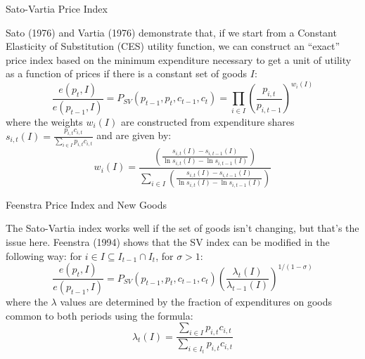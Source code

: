 \documentclass[aspectratio=169]{beamer}
\begin{document}

\begin{frame}{Sato-Vartia Price Index}

Sato (1976) and Vartia (1976) demonstrate that, if we start from a Constant Elasticity of Substitution (CES) utility function, we can construct an ``exact” price index based on the minimum expenditure necessary to get a unit of utility as a function of prices if there is a constant set of goods $ I $:
\begin{equation*}
    \frac{e\left( p_{t}, I \right)}{e\left( p_{t-1}, I \right)} = P_{SV}\left( p_{t-1}, p_{t}, c_{t-1}, c_{t} \right) = \prod_{i \in I}{\left( \frac{p_{i,t}}{p_{i,t-1}} \right)^{w_{i}\left( I \right)}}
\end{equation*}
where the weights $ w_{i}\left( I \right) $ are constructed from expenditure shares $ s_{i,t}\left( I \right) = \frac{p_{i,t} c_{i,t}}{\sum_{i \in I}{p_{i,t} c_{i,t}}} $ and are given by:
\begin{equation*}
    w_{i}\left( I \right) =  \frac{\left( \frac{s_{i,t}\left( I \right) - s_{i,t-1}\left( I \right)}{\ln{s_{i,t}\left( I \right)} - \ln{s_{i,t-1}\left( I \right)}} \right)}{\sum_{i \in I}{\left( \frac{s_{i,t}\left( I \right) - s_{i,t-1}\left( I \right)}{\ln{s_{i,t}\left( I \right)} - \ln{s_{i,t-1}\left( I \right)}} \right)}}
\end{equation*}
    
\end{frame}


\begin{frame}{Feenstra Price Index and New Goods}

The Sato-Vartia index works well if the set of goods isn’t changing, but that’s the issue here.  Feenstra (1994) shows that the SV index can be modified in the following way: for $ i \in I \subseteq I_{t-1} \cap I_{t} $, for $ \sigma > 1 $:
\begin{equation*}
    \frac{e\left( p_{t}, I \right)}{e\left( p_{t-1}, I \right)} = P_{SV}\left( p_{t-1}, p_{t}, c_{t-1}, c_{t} \right)\left( \frac{\lambda_{t}\left( I \right)}{\lambda_{t-1}\left( I \right)} \right)^{1 / \left( 1 - \sigma \right)}
\end{equation*}
where the $ \lambda $ values are determined by the fraction of expenditures on goods common to both periods using the formula:
\begin{equation*}
    \lambda_{t}\left( I \right) = \frac{\sum_{i \in I}p_{i,t} c_{i,t}}{\sum_{i \in I_{t}}p_{i,t} c_{i,t}}
\end{equation*}
    
\end{frame}
\end{document}
